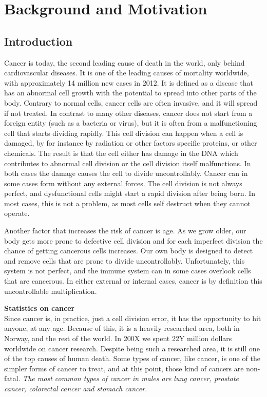 \section{Background and Motivation}

\subsection{Introduction}
Cancer is today, the second leading cause of death in the world, only behind cardiovascular diseases.  %
It is one of the leading causes of mortality worldwide, with approximately 14 million new cases in 2012.\cite{WHOCANCER}
It is defined as a disease that has an abnormal cell growth with the potential to spread into other parts of the body.\cite{WhatIsCancer}
Contrary to normal cells, cancer cells are often invasive, and it will spread if not treated. 
In contrast to many other diseases, cancer does not start from a foreign entity (such as a bacteria or virus), but it is often from a malfunctioning cell that starts dividing rapidly. 
This cell division can happen when a cell is damaged, by for instance by radiation or other factors specific proteins, or other chemicals. The result is that the cell either has damage in the DNA which contributes to abnormal cell division or the cell division itself malfunctions. In both cases the damage causes the cell to divide uncontrollably. 
Cancer can in some cases form without any external forces. The cell division is not always perfect, and dysfunctional cells might start a rapid division after being born. In most cases, this is not a problem, as most cells self destruct when they cannot operate. 

Another factor that increases the risk of cancer is age. As we grow older, our body gets more prone to defective cell division and for each imperfect division the chance of getting cancerous cells increases.  
Our own body is designed to detect and remove cells that are prone to divide uncontrollably. Unfortunately, this system is not perfect, and the immune system can in some cases overlook cells that are cancerous.
In either external or internal cases, cancer is by definition this uncontrollable multiplication.




\textbf{Statistics on cancer}\\
Since cancer is, in practice, just a cell division error, it has the opportunity to hit anyone, at any age. Because of this, it is a heavily researched area, both in Norway, and the rest of the world.
In 200X we spent 22Y million dollars worldwide on cancer research. 
Despite being such a researched area, it is still one of the top causes of human death. 
Some types of cancer, like \todo{} cancer, is one of the simpler forms of cancer to treat, and at this point, those kind of cancers are non-fatal. 
\textit{The most common types of cancer in males are lung cancer, prostate cancer, colorectal cancer and stomach cancer.\cite{stewart2014world}}
    
